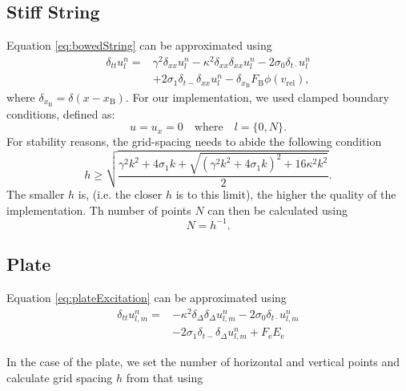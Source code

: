 \documentclass{article}
\begin{document}
\subsection{Stiff String}\label{subsec:stiffStringFDS}
Equation \eqref{eq:bowedString} can be approximated using
\begin{equation}
\begin{aligned}
\delta_{tt} u_l^n =&\gamma^2 \delta_{xx} u_l^n -\kappa^2\delta_{xx}\delta_{xx} u_l^n - 2\sigma_0\delta_{t\cdot} u_l^n  \\
&+ 2\sigma_1\delta_{t-}\delta_{xx}u_l^n - \delta_{x_\text{B}}F_\text{B}\phi(v_\text{rel}),
\end{aligned}
\end{equation}
where $\delta_{x_\text{B}} = \delta(x-x_\text{B})$.
For our implementation, we used clamped boundary conditions, defined as:
\begin{equation}\label{boundary}
    u = u_x = 0 \quad \text{where} \quad l = \{0, N\}.
  \end{equation}
For stability reasons, the grid-spacing needs to abide the following condition
\begin{equation}
    h \geq \sqrt{\frac{\gamma^2 k^2 + 4 \sigma_1 k + \sqrt {(\gamma^2 k^2 + 4 \sigma_1 k)^2 + 16 \kappa^2 k^2}}{2}}.
\end{equation}
The smaller $h$ is, (i.e. the closer $h$ is to this limit), the higher the quality of the implementation. Th number of points $N$ can then be calculated using 
\begin{equation}
    N = h^{-1}.
\end{equation}


\subsection{Plate}
  

Equation \eqref{eq:plateExcitation} can be approximated using
\begin{equation}
    \begin{aligned}
        \delta_{tt}u_{l,m}^n = &-\kappa^2 \delta_\Delta\delta_\Delta u_{l,m}^n - 2\sigma_0\delta_{t\cdot}u_{l,m}^n \\
        &- 2\sigma_1\delta_{t−}\delta_\Delta u_{l,m}^n + F_\text{e}E_\text{e}
    \end{aligned}
\end{equation}

In the case of the plate, we set the number of horizontal and vertical points and calculate grid spacing $h$ from that using 
\end{document}
